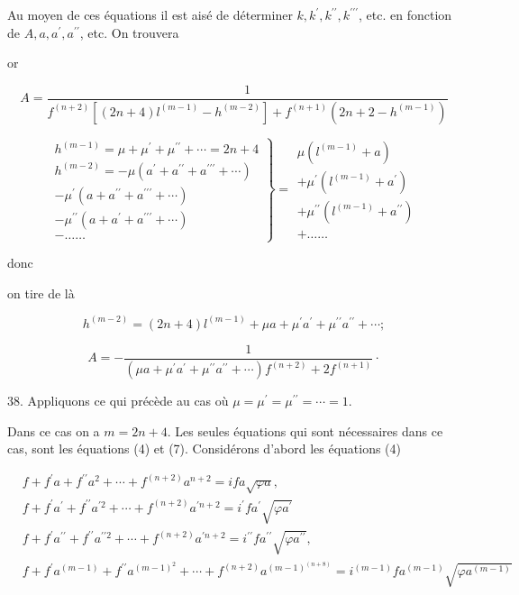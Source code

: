 \documentclass{article}
\begin{document}

Au moyen de ces équations il est aisé de déterminer \(k, k^{\prime}, k^{\prime \prime}, k^{\prime \prime \prime}\), etc. en fonction de \(A, a, a^{\prime}, a^{\prime \prime}\), etc. On trouvera

or

\[
A=\frac{1}{f^{(n+2)}\left[(2 n+4) l^{(m-1)}-h^{(m-2)}\right]+f^{(n+1)}\left(2 n+2-h^{(m-1)}\right)}
\]

\[
\left.\begin{array}{c}
h^{(m-1)}=\mu+\mu^{\prime}+\mu^{\prime \prime}+\cdots=2 n+4 \\
h^{(m-2)}=-\mu\left(a^{\prime}+a^{\prime \prime}+a^{\prime \prime \prime}+\cdots\right) \\
-\mu^{\prime}\left(a+a^{\prime \prime}+a^{\prime \prime \prime}+\cdots\right) \\
-\mu^{\prime \prime}\left(a+a^{\prime}+a^{\prime \prime \prime}+\cdots\right) \\
-\ldots \ldots
\end{array}\right\}=\begin{array}{r}
\mu\left(l^{(m-1)}+a\right) \\
+\mu^{\prime}\left(l^{(m-1)}+a^{\prime}\right) \\
+\mu^{\prime \prime}\left(l^{(m-1)}+a^{\prime \prime}\right) \\
+\ldots \ldots
\end{array}
\]

donc

on tire de là

\[
h^{(m-2)}=(2 n+4) l^{(m-1)}+\mu a+\mu^{\prime} a^{\prime}+\mu^{\prime \prime} a^{\prime \prime}+\cdots ;
\]

\[
A=-\frac{1}{\left(\mu a+\mu^{\prime} a^{\prime}+\mu^{\prime \prime} a^{\prime \prime}+\cdots\right) f^{(n+2)}+2 f^{(n+1)}} \cdot
\]

38. Appliquons ce qui précède au cas où \(\mu=\mu^{\prime}=\mu^{\prime \prime}=\cdots=1\).

Dans ce cas on a \(m=2 n+4\). Les seules équations qui sont nécessaires dans ce cas, sont les équations (4) et (7). Considérons d'abord les équations (4)

\[
\begin{aligned}
& f+f^{\prime} a+f^{\prime \prime} a^{2}+\cdots+f^{(n+2)} a^{n+2}=i f a \sqrt{\varphi a}, \\
& f+f^{\prime} a^{\prime}+f^{\prime \prime} a^{\prime 2}+\cdots+f^{(n+2)} a^{\prime n+2}=i^{\prime} f a^{\prime} \sqrt{\varphi a^{\prime}} \\
& f+f^{\prime} a^{\prime \prime}+f^{\prime \prime} a^{\prime \prime 2}+\cdots+f^{(n+2)} a^{\prime n+2}=i^{\prime \prime} f a^{\prime \prime} \sqrt{\varphi a^{\prime \prime}}, \\
& f+f^{\prime} a^{(m-1)}+f^{\prime \prime} a^{(m-1)^{2}}+\cdots+f^{(n+2)} a^{(m-1)^{(n+8)}}=i^{(m-1)} f a^{(m-1)} \sqrt{\varphi a^{(m-1)}}
\end{aligned}
\]
\end{document}
